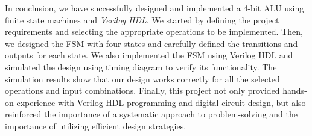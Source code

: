 In conclusion, we have successfully designed and implemented a 4-bit ALU using finite state machines and \textit{Verilog HDL}.
We started by defining the project requirements and selecting the appropriate operations to be implemented.
Then, we designed the FSM with four states and carefully defined the transitions and outputs for each state.
We also implemented the FSM using Verilog HDL and simulated the design using timing diagram to verify its functionality.
The simulation results show that our design works correctly for all the selected operations and input combinations.
Finally, this project not only provided hands-on experience with Verilog HDL programming and digital circuit design, but also reinforced the
importance of a systematic approach to problem-solving and the importance of utilizing efficient design strategies.
